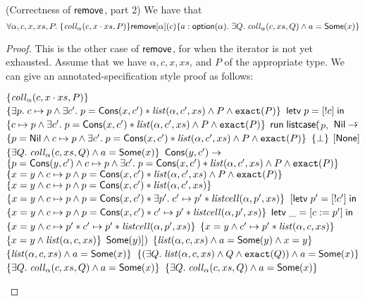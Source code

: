\begin{lemma}{(Correctness of $\mathsf{remove}$, part 2)}
We have that 
\begin{displaymath}
  \forall \alpha, c, x, xs, P.\; \{{\mathit{coll}_\alpha(c, x\cdot xs, P)}\}{\mathsf{remove}[\alpha](c)}\{{a:\mathsf{option }{(\alpha)}}.\;{\exists Q.\; \mathit{coll}_\alpha(c, xs, Q) 
                                       \land a = \mathsf{Some}(x)}\}
\end{displaymath}
\end{lemma}

\begin{proof}
This is the other case of $\mathsf{remove}$, for when the iterator is not
yet exhausted. Assume that we have $\alpha, c, x, xs$, and $P$ of the
appropriate type. We can give an annotated-specification style proof
as follows:

\begin{specification}
\nextline $\{{\mathit{coll}_\alpha(c, x\cdot xs, P)}\}$ 
\nextline $\{{\exists p.\; c \mapsto p \land \exists c'.\; p = \mathsf{Cons}(x, c') * \mathit{list}(\alpha, c', xs) \land P \land \mathtt{exact}({P})}\}$ 
\nextline $\mathsf{letv}\;p = [!c]\;\mathsf{in}\;$ 
\nextline $\{{c \mapsto p \land \exists c'.\; p = \mathsf{Cons}(x, c') * \mathit{list}(\alpha, c', xs) \land P \land \mathtt{exact}({P})}\}$ 
\nextline $\mathsf{run}\;\mathsf{listcase}($\=$p,$ 
\nextline \> $\mathsf{Nil} \to $\= $\{{p = \mathsf{Nil} \land c \mapsto p \land \exists c'.\; p = \mathsf{Cons}(x, c') * \mathit{list}(\alpha, c', xs) \land P \land \mathtt{exact}({P})}\}$ 
\nextline \> \> $\{{\bot}\}$
\nextline \> \> $[\mathsf{None}]$ 
\nextline \> \> $\{{\exists Q.\; \mathit{coll}_\alpha(c, xs, Q) \land a = \mathsf{Some}(x)}\}$
\nextline \> $\mathsf{Cons}(y, c') \to $ 
\nextline \> \> $\{{p = \mathsf{Cons}(y, c') \land c \mapsto p \land \exists c'.\; p = \mathsf{Cons}(x, c') * \mathit{list}(\alpha, c', xs) \land P \land \mathtt{exact}({P})}\}$ 
\nextline \> \> $\{{x = y \land c \mapsto p \land p = \mathsf{Cons}(x, c') * \mathit{list}(\alpha, c', xs) \land P \land \mathtt{exact}({P})}\}$ 
\nextline \> \> $\{{x = y \land c \mapsto p \land p = \mathsf{Cons}(x, c') * \mathit{list}(\alpha, c', xs)}\}$
\nextline \> \> $\{{x = y \land c \mapsto p \land p = \mathsf{Cons}(x, c') * \exists p'.\; c' \mapsto p' * \mathit{listcell}(\alpha, p', xs)}\}$
\nextline \> \> $[\mathsf{letv}\;p' = [!c']\;\mathsf{in}\;$ 
\nextline \> \> $\{{x = y \land c \mapsto p \land p = \mathsf{Cons}(x, c') * c' \mapsto p' * \mathit{listcell}(\alpha, p', xs)}\}$
\nextline \> \> $\mathsf{letv}\;\_ = [c := p']\;\mathsf{in}\;$ 
\nextline \> \> $\{{x = y \land c \mapsto p' * c' \mapsto p' * \mathit{listcell}(\alpha, p', xs)}\}$
\nextline \> \> $\{{x = y \land c' \mapsto p' * \mathit{list}(\alpha, c, xs)}\}$
\nextline \> \> $\{{x = y \land \mathit{list}(\alpha, c, xs)}\}$
\nextline \> \> $\mathsf{Some}(y)])$
\nextline \> \> $\{{\mathit{list}(\alpha, c, xs) \land a = \mathsf{Some}(y) \land x = y}\}$ 
\nextline \> \> $\{{\mathit{list}(\alpha,c, xs) \land a = \mathsf{Some}(x)}\}$
\nextline \> \> $\{{(\exists Q.\; \mathit{list}(\alpha,c, xs) \land Q \land \mathtt{exact}({Q})) \land a = \mathsf{Some}(x)}\}$
\nextline \> \> $\{{\exists Q.\; \mathit{coll}_\alpha(c, xs, Q) \land a = \mathsf{Some}(x)}\}$
\nextline $\{{\exists Q.\; \mathit{coll}_\alpha(c, xs, Q) \land a = \mathsf{Some}(x)}\}$
\end{specification}
\end{proof}

